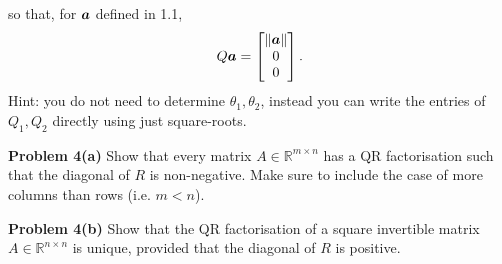 \documentclass[12pt,a4paper]{article}
\def\bbR{ {\mathbb R} }
\def\a{ {\vc a} }
\begin{document}
so that, for $\ensuremath{\bm{\a}}$ defined in 1.1, 
\[
Q \ensuremath{\bm{\a}}  = \begin{bmatrix} \|\ensuremath{\bm{\a}}\| \\ 0 \\ 0 \end{bmatrix}.
\]
Hint: you do not need to determine $\ensuremath{\theta}_1, \ensuremath{\theta}_2$, instead you can write the entries of  $Q_1, Q_2$  directly using just square-roots. 

\textbf{Problem 4(a)} Show that every matrix $A \ensuremath{\in} \ensuremath{\bbR}^{m \ensuremath{\times} n}$ has a  QR factorisation such that the diagonal of $R$ is non-negative. Make sure to include the case of more columns than rows (i.e. $m < n$). 

\textbf{Problem 4(b)} Show that the QR factorisation of a square invertible matrix $A \ensuremath{\in} \ensuremath{\bbR}^{n \ensuremath{\times} n}$ is unique, provided that the diagonal of $R$ is positive.
\end{document}
